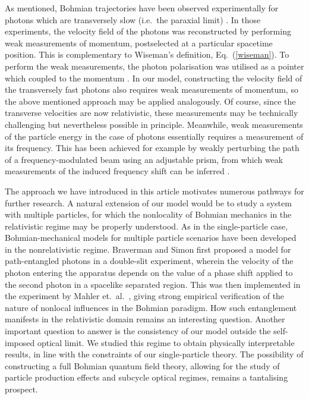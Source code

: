 \documentclass[12pt,prx,
,nofootinbib
,floatfix
,superscriptaddress
]{revtex4-2}
\begin{document}
As mentioned, Bohmian trajectories have been observed experimentally for photons which are transversely slow (i.e.\ the paraxial limit) \cite{kocsis2011observing, mahler2016experimental}. In those experiments, the velocity field of the photons was reconstructed by performing weak measurements of momentum, postselected at a particular spacetime position. This is complementary to Wiseman's definition, Eq.\ (\ref{wiseman}). To perform the weak measurements, the photon polarisation was utilised as a pointer which coupled to the momentum \cite{kocsis2011observing}. In our model, constructing the velocity field of the transversely fast photons also requires weak measurements of momentum, so the above mentioned approach may be applied analogously. Of course, since the transverse velocities are now relativistic, these measurements may be technically challenging but nevertheless possible in principle. Meanwhile, weak measurements of the particle energy in the case of photons essentially requires a measurement of its frequency. This has been achieved for example by weakly perturbing the path of a frequency-modulated beam using an adjustable prism, from which weak measurements of the induced frequency shift can be inferred \cite{starlingPhysRevA.82.063822,zhouPhysRevA.95.042121,dresselRevModPhys.86.307}. 

The approach we have introduced in this article motivates numerous pathways for further research. A natural extension of our model would be to study a system with multiple particles, for which the nonlocality of Bohmian mechanics in the relativistic regime may be properly understood. As in the single-particle case, Bohmian-mechanical models for multiple particle scenarios have been developed in the nonrelativistic regime. Braverman and Simon \cite{bravermanPhysRevLett.110.060406} first proposed a model for path-entangled photons in a double-slit experiment, wherein the velocity of the photon entering the apparatus depends on the value of a phase shift applied to the second photon in a spacelike separated region. This was then implemented in the experiment by Mahler et.\ al.\ \cite{mahler2016experimental}, giving strong empirical verification of the nature of nonlocal influences in the Bohmian paradigm. How such entanglement manifests in the relativistic domain remains an interesting question. Another important question to answer is the consistency of our model outside the self-imposed optical limit. We studied this regime to obtain physically interpretable results, in line with the constraints of our single-particle theory. The possibility of constructing a full Bohmian quantum field theory, allowing for the study of particle production effects and subcycle optical regimes, remains a tantalising prospect.   
\end{document}
